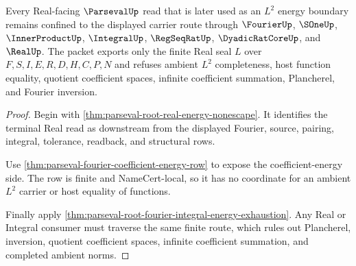 \begin{theorem}
\label{thm:parseval-real-l2-boundary-refusal}
Every Real-facing $\ParsevalUp$ read that is later used as an $L^2$ energy boundary remains confined to the displayed carrier route through $\FourierUp$, $\SOneUp$, $\InnerProductUp$, $\IntegralUp$, $\RegSeqRatUp$, $\DyadicRatCoreUp$, and $\RealUp$. The packet exports only the finite Real seal $L$ over $F,S,I,E,R,D,H,C,P,N$ and refuses ambient $L^2$ completeness, host function equality, quotient coefficient spaces, infinite coefficient summation, Plancherel, and Fourier inversion.
\end{theorem}
\begin{proof}
Begin with \autoref{thm:parseval-root-real-energy-nonescape}. It identifies the terminal Real read as downstream from the displayed Fourier, source, pairing, integral, tolerance, readback, and structural rows.

Use \autoref{thm:parseval-fourier-coefficient-energy-row} to expose the coefficient-energy side. The row is finite and NameCert-local, so it has no coordinate for an ambient $L^2$ carrier or host equality of functions.

Finally apply \autoref{thm:parseval-root-fourier-integral-energy-exhaustion}. Any Real or Integral consumer must traverse the same finite route, which rules out Plancherel, inversion, quotient coefficient spaces, infinite coefficient summation, and completed ambient norms.
\end{proof}


